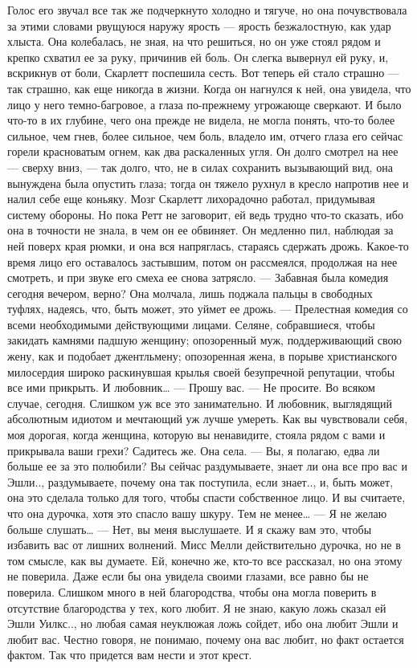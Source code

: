 Голос его звучал все так же подчеркнуто холодно и тягуче, но она почувствовала за этими словами рвущуюся наружу ярость — ярость безжалостную, как удар хлыста. Она колебалась, не зная, на что решиться, но он уже стоял рядом и крепко схватил ее за руку, причинив ей боль. Он слегка вывернул ей руку, и, вскрикнув от боли, Скарлетт поспешила сесть. Вот теперь ей стало страшно — так страшно, как еще никогда в жизни. Когда он нагнулся к ней, она увидела, что лицо у него темно-багровое, а глаза по-прежнему угрожающе сверкают. И было что-то в их глубине, чего она прежде не видела, не могла понять, что-то более сильное, чем гнев, более сильное, чем боль, владело им, отчего глаза его сейчас горели красноватым огнем, как два раскаленных угля. Он долго смотрел на нее — сверху вниз, — так долго, что, не в силах сохранить вызывающий вид, она вынуждена была опустить глаза; тогда он тяжело рухнул в кресло напротив нее и налил себе еще коньяку. Мозг Скарлетт лихорадочно работал, придумывая систему обороны. Но пока Ретт не заговорит, ей ведь трудно что-то сказать, ибо она в точности не знала, в чем он ее обвиняет.
Он медленно пил, наблюдая за ней поверх края рюмки, и она вся напряглась, стараясь сдержать дрожь. Какое-то время лицо его оставалось застывшим, потом он рассмеялся, продолжая на нее смотреть, и при звуке его смеха ее снова затрясло.
— Забавная была комедия сегодня вечером, верно? Она молчала, лишь поджала пальцы в свободных туфлях, надеясь, что, быть может, это уймет ее дрожь.
— Прелестная комедия со всеми необходимыми действующими лицами. Селяне, собравшиеся, чтобы закидать камнями падшую женщину; опозоренный муж, поддерживающий свою жену, как и подобает джентльмену; опозоренная жена, в порыве христианского милосердия широко раскинувшая крылья своей безупречной репутации, чтобы все ими прикрыть. И любовник…
— Прошу вас.
— Не просите. Во всяком случае, сегодня. Слишком уж все это занимательно. И любовник, выглядящий абсолютным идиотом и мечтающий уж лучше умереть. Как вы чувствовали себя, моя дорогая, когда женщина, которую вы ненавидите, стояла рядом с вами и прикрывала ваши грехи? Садитесь же.
Она села.
— Вы, я полагаю, едва ли больше ее за это полюбили? Вы сейчас раздумываете, знает ли она все про вас и Эшли.., раздумываете, почему она так поступила, если знает.., и, быть может, она это сделала только для того, чтобы спасти собственное лицо. И вы считаете, что она дурочка, хотя это спасло вашу шкуру. Тем не менее…
— Я не желаю больше слушать…
— Нет, вы меня выслушаете. И я скажу вам это, чтобы избавить вас от лишних волнений. Мисс Мелли действительно дурочка, но не в том смысле, как вы думаете. Ей, конечно же, кто-то все рассказал, но она этому не поверила. Даже если бы она увидела своими глазами, все равно бы не поверила. Слишком много в ней благородства, чтобы она могла поверить в отсутствие благородства у тех, кого любит. Я не знаю, какую ложь сказал ей Эшли Уилкс.., но любая самая неуклюжая ложь сойдет, ибо она любит Эшли и любит вас. Честно говоря, не понимаю, почему она вас любит, но факт остается фактом. Так что придется вам нести и этот крест.
